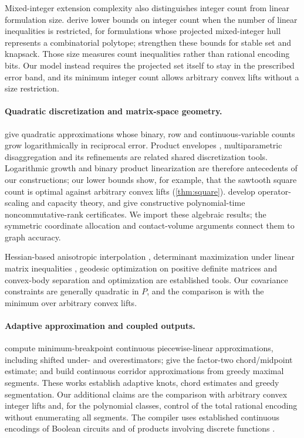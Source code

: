 Mixed-integer extension complexity also distinguishes integer count from
linear formulation size. \citet{cevallos2018} derive lower bounds on
integer count when the number of linear inequalities is restricted,
for formulations whose projected mixed-integer hull represents a
combinatorial polytope; \citet{schade2026} strengthen these bounds for
stable set and knapsack. Those size measures count inequalities rather
than rational encoding bits. Our model instead requires the projected set
itself to stay in the prescribed error band, and its minimum integer
count allows arbitrary convex lifts without a size restriction.

\paragraph{Quadratic discretization and matrix-space geometry.}
\citet{beach2022} give quadratic approximations whose binary, row and
continuous-variable counts grow logarithmically in reciprocal error.
Product envelopes \citep{mccormick1976}, multiparametric disaggregation
\citep{teles2013} and its refinements \citep{beach2024,beach2024b} are
related shared discretization tools. Logarithmic growth and binary
product linearization are therefore antecedents of our constructions;
our lower bounds show, for example, that the sawtooth square count is
optimal against arbitrary convex lifts (\cref{thm:square}).
\citet{ggow2020} develop operator-scaling and capacity theory, and
\citet{iqs2018} give constructive polynomial-time noncommutative-rank
certificates. We import these algebraic results; the symmetric
coordinate allocation and contact-volume arguments connect them to graph
accuracy.

Hessian-based anisotropic interpolation \citep{cao2007}, determinant
maximization under linear matrix inequalities \citep{vandenberghe1998},
geodesic optimization on positive definite matrices
\citep{sra2013,zhang2016} and convex-body separation and optimization
\citep{gls1981} are established tools. Our covariance constraints are
generally quadratic in $P$, and the comparison is with the minimum over
arbitrary convex lifts.

\paragraph{Adaptive approximation and coupled outputs.}
\citet{rebennack2015} compute minimum-breakpoint continuous
piecewise-linear approximations, including shifted under- and
overestimators; \citet[Lemma 2.1]{simchowitz2018} give the factor-two
chord/midpoint estimate; and \citet[Sections 3--4]{codsi2025} build
continuous corridor approximations from greedy maximal segments. These
works establish adaptive knots, chord
estimates and greedy segmentation. Our additional claims are the
comparison with arbitrary convex integer lifts and, for the polynomial
classes, control of the total rational encoding without enumerating all
segments. The compiler uses established continuous encodings of Boolean
circuits \citep{avis2019} and of products involving discrete functions
\citep{adams2012}.

